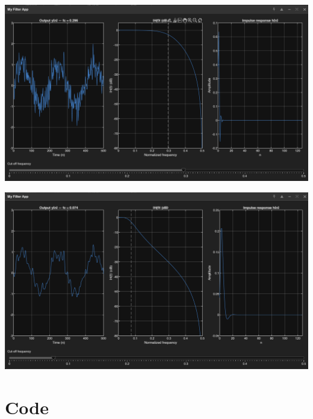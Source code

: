 \documentclass[11pt]{article}
\begin{document}
\begin{center}
    \includegraphics[scale=0.4]{SS1.png}
\end{center}
\begin{center}
    \includegraphics[scale=0.4]{SS2.png}
\end{center}

\pagebreak

\section*{Code}
\end{document}
